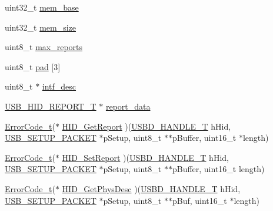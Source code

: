 \begin{DoxyCompactItemize}
\item 
uint32\-\_\-t \hyperlink{structUSBD__HID__INIT__PARAM_aa53ec81868fce2b2ec22b3053f9d000a}{mem\-\_\-base}
\item 
uint32\-\_\-t \hyperlink{structUSBD__HID__INIT__PARAM_a79aeddb1f4f4c9d77cacd17cf6c26499}{mem\-\_\-size}
\item 
uint8\-\_\-t \hyperlink{structUSBD__HID__INIT__PARAM_a40d5967d9d4a156395871f4af996a15f}{max\-\_\-reports}
\item 
uint8\-\_\-t \hyperlink{structUSBD__HID__INIT__PARAM_abe66157322df2a9f655708b8ae2795e9}{pad} \mbox{[}3\mbox{]}
\item 
uint8\-\_\-t $\ast$ \hyperlink{structUSBD__HID__INIT__PARAM_ac1479de61c27a705a2df0e3941744671}{intf\-\_\-desc}
\item 
\hyperlink{group__USBD__HID_gaaa1686adb431783ea4357e6899c0d39d}{U\-S\-B\-\_\-\-H\-I\-D\-\_\-\-R\-E\-P\-O\-R\-T\-\_\-\-T} $\ast$ \hyperlink{structUSBD__HID__INIT__PARAM_a2e46476d82b7859a239feeadf457d0e8}{report\-\_\-data}
\item 
\hyperlink{error_8h_a905255056c349318139d94aa4523d516}{Error\-Code\-\_\-t}($\ast$ \hyperlink{structUSBD__HID__INIT__PARAM_a38fd39f046d8db7eec000361e26d5d9c}{H\-I\-D\-\_\-\-Get\-Report} )(\hyperlink{group__USBD__Core_gafdbb2204d929cb9d75736bd2b42342ac}{U\-S\-B\-D\-\_\-\-H\-A\-N\-D\-L\-E\-\_\-\-T} h\-Hid, \hyperlink{group__USBD__Core_ga4a940f7627cc7e9f0bb693cc0fce8637}{U\-S\-B\-\_\-\-S\-E\-T\-U\-P\-\_\-\-P\-A\-C\-K\-E\-T} $\ast$p\-Setup, uint8\-\_\-t $\ast$$\ast$p\-Buffer, uint16\-\_\-t $\ast$length)
\item 
\hyperlink{error_8h_a905255056c349318139d94aa4523d516}{Error\-Code\-\_\-t}($\ast$ \hyperlink{structUSBD__HID__INIT__PARAM_a7c3c14faf847603b89df583b09a218e9}{H\-I\-D\-\_\-\-Set\-Report} )(\hyperlink{group__USBD__Core_gafdbb2204d929cb9d75736bd2b42342ac}{U\-S\-B\-D\-\_\-\-H\-A\-N\-D\-L\-E\-\_\-\-T} h\-Hid, \hyperlink{group__USBD__Core_ga4a940f7627cc7e9f0bb693cc0fce8637}{U\-S\-B\-\_\-\-S\-E\-T\-U\-P\-\_\-\-P\-A\-C\-K\-E\-T} $\ast$p\-Setup, uint8\-\_\-t $\ast$$\ast$p\-Buffer, uint16\-\_\-t length)
\item 
\hyperlink{error_8h_a905255056c349318139d94aa4523d516}{Error\-Code\-\_\-t}($\ast$ \hyperlink{structUSBD__HID__INIT__PARAM_ab57ca939277e8484271738dec9fb9789}{H\-I\-D\-\_\-\-Get\-Phys\-Desc} )(\hyperlink{group__USBD__Core_gafdbb2204d929cb9d75736bd2b42342ac}{U\-S\-B\-D\-\_\-\-H\-A\-N\-D\-L\-E\-\_\-\-T} h\-Hid, \hyperlink{group__USBD__Core_ga4a940f7627cc7e9f0bb693cc0fce8637}{U\-S\-B\-\_\-\-S\-E\-T\-U\-P\-\_\-\-P\-A\-C\-K\-E\-T} $\ast$p\-Setup, uint8\-\_\-t $\ast$$\ast$p\-Buf, uint16\-\_\-t $\ast$length)
$$
\end{DoxyCompactItemize}
